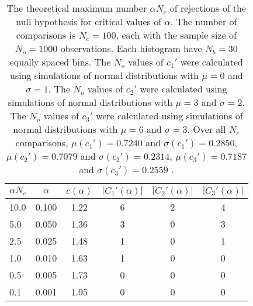 \begin{table}[h!]
\begin{center}
\begin{tabular}{| l | c | c | c | c | c |}\hline
$\alpha N_c$ & $\alpha$ & $c(\alpha)$ & $|C_1'(\alpha)|$ & $|C_2'(\alpha)|$ & $|C_3'(\alpha)|$ \\\hline
10.0 & 0.100 & 1.22 & 6 & 2 & 4 \\\hline
5.0 & 0.050 & 1.36 & 3 & 0 & 3 \\\hline
2.5 & 0.025 & 1.48 & 1 & 0 & 1 \\\hline
1.0 & 0.010 & 1.63 & 1 & 0 & 0 \\\hline
0.5 & 0.005 & 1.73 & 0 & 0 & 0 \\\hline
0.1 & 0.001 & 1.95 & 0 & 0 & 0 \\\hline
\end{tabular}
\caption{The theoretical maximum number $\alpha N_c$ of rejections
of the null hypothesis for critical values of $\alpha$.
The number of comparisons is $N_c=100$,
each with the sample size of $N_o=1000$ observations.
Each histogram have $N_b=30$ equally spaced bins.
The $N_o$ values of $c_1'$ were calculated using simulations of
 normal distributions with $\mu=0$ and $\sigma=1$.
The $N_o$ values of $c_2'$ were calculated using simulations of
 normal distributions with $\mu=3$ and $\sigma=2$.
The $N_o$ values of $c_3'$ were calculated using simulations of
 normal distributions with $\mu=6$ and $\sigma=3$.
Over all $N_c$ comparisons,
 $\mu(c_1')=0.7240$ and $\sigma(c_1')=0.2850$,
 $\mu(c_2')=0.7079$ and $\sigma(c_2')=0.2314$,
 $\mu(c_3')=0.7187$ and $\sigma(c_3')=0.2559$ .
}
\end{center}
\end{table}